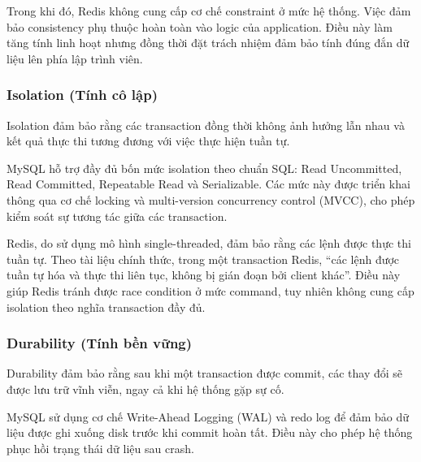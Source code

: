 Trong khi đó, Redis không cung cấp cơ chế constraint ở mức hệ thống. Việc đảm bảo consistency phụ thuộc hoàn toàn vào logic của application. Điều này làm tăng tính linh hoạt nhưng đồng thời đặt trách nhiệm đảm bảo tính đúng đắn dữ liệu lên phía lập trình viên.

\subsubsection{Isolation (Tính cô lập)}

Isolation đảm bảo rằng các transaction đồng thời không ảnh hưởng lẫn nhau và kết quả thực thi tương đương với việc thực hiện tuần tự.

MySQL hỗ trợ đầy đủ bốn mức isolation theo chuẩn SQL: Read Uncommitted, Read Committed, Repeatable Read và Serializable. Các mức này được triển khai thông qua cơ chế locking và multi-version concurrency control (MVCC), cho phép kiểm soát sự tương tác giữa các transaction.

Redis, do sử dụng mô hình single-threaded, đảm bảo rằng các lệnh được thực thi tuần tự. Theo tài liệu chính thức, trong một transaction Redis, ``các lệnh được tuần tự hóa và thực thi liên tục, không bị gián đoạn bởi client khác''. Điều này giúp Redis tránh được race condition ở mức command, tuy nhiên không cung cấp isolation theo nghĩa transaction đầy đủ.

\subsubsection{Durability (Tính bền vững)}

Durability đảm bảo rằng sau khi một transaction được commit, các thay đổi sẽ được lưu trữ vĩnh viễn, ngay cả khi hệ thống gặp sự cố.

MySQL sử dụng cơ chế Write-Ahead Logging (WAL) và redo log để đảm bảo dữ liệu được ghi xuống disk trước khi commit hoàn tất. Điều này cho phép hệ thống phục hồi trạng thái dữ liệu sau crash.

